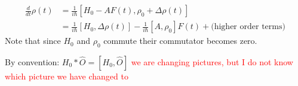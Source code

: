 \documentclass{article}
\begin{document}
\vspace{5mm}

\begin{align}
\frac{d}{dt}\rho(t) & =\frac{1}{i\hbar}[H_0-AF(t),\rho_0+\Delta\rho(t)]\\
& = \frac{1}{i\hbar}[H_0,\Delta\rho(t)]-\frac{1}{i\hbar}[A,\rho_0]F(t) + \text{(higher order terms)}
\end{align}
Note that since $H_0$ and $\rho_0$ commute their commutator becomes zero. 

\vspace{5mm}

By convention: $H_0*\hat{O}=[H_0,\hat{O}]$ \textcolor{red}{we are changing pictures, but I do not know which picture we have changed to}
\end{document}
